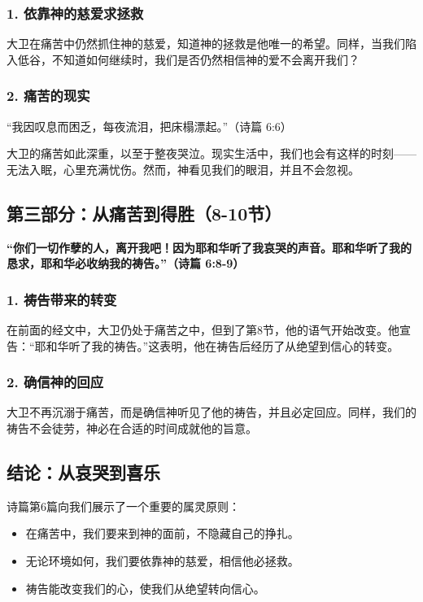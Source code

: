 \documentclass[a4paper, 12pt]{article}
\begin{document}
\subsubsection*{1. 依靠神的慈爱求拯救}

大卫在痛苦中仍然抓住神的慈爱，知道神的拯救是他唯一的希望。同样，当我们陷入低谷，不知道如何继续时，我们是否仍然相信神的爱不会离开我们？

\subsubsection*{2. 痛苦的现实}

“我因叹息而困乏，每夜流泪，把床榻漂起。”（诗篇 6:6）

大卫的痛苦如此深重，以至于整夜哭泣。现实生活中，我们也会有这样的时刻——无法入眠，心里充满忧伤。然而，神看见我们的眼泪，并且不会忽视。

\subsection*{第三部分：从痛苦到得胜（8-10节）}

\textbf{“你们一切作孽的人，离开我吧！因为耶和华听了我哀哭的声音。耶和华听了我的恳求，耶和华必收纳我的祷告。”（诗篇 6:8-9）}

\subsubsection*{1. 祷告带来的转变}

在前面的经文中，大卫仍处于痛苦之中，但到了第8节，他的语气开始改变。他宣告：“耶和华听了我的祷告。”这表明，他在祷告后经历了从绝望到信心的转变。

\subsubsection*{2. 确信神的回应}

大卫不再沉溺于痛苦，而是确信神听见了他的祷告，并且必定回应。同样，我们的祷告不会徒劳，神必在合适的时间成就他的旨意。

\subsection*{结论：从哀哭到喜乐}

诗篇第6篇向我们展示了一个重要的属灵原则：

\begin{itemize}
    \item 在痛苦中，我们要来到神的面前，不隐藏自己的挣扎。
    \item 无论环境如何，我们要依靠神的慈爱，相信他必拯救。
    \item 祷告能改变我们的心，使我们从绝望转向信心。
\end{itemize}
\end{document}
